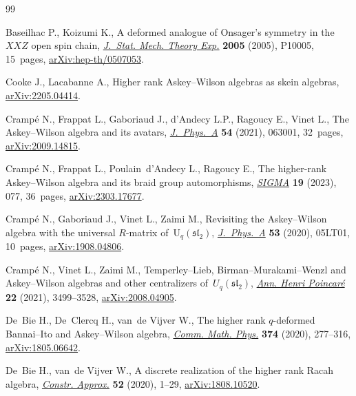 \documentclass[pdftex]{sigma}
\numberwithin{equation}{section}
\begin{document}
\begin{thebibliography}{99}
\footnotesize\itemsep=0pt

Baseilhac P., Koizumi K., A deformed analogue of {O}nsager's symmetry in
 the~{$XXZ$} open spin chain, \href{https://doi.org/10.1088/1742-5468/2005/10/p10005}{\textit{J.~Stat. Mech. Theory Exp.}}
 \textbf{2005} (2005), P10005, 15~pages, \href{https://arxiv.org/abs/hep-th/0507053}{arXiv:hep-th/0507053}.

Cooke J., Lacabanne A., Higher rank {A}skey--{W}ilson algebras as skein
 algebras, \href{https://arxiv.org/abs/2205.04414}{arXiv:2205.04414}.

Cramp\'e N., Frappat L., Gaboriaud J., d'Andecy L.P., Ragoucy E., Vinet L., The
 {A}skey--{W}ilson algebra and its avatars, \href{https://doi.org/10.1088/1751-8121/abd783}{\textit{J.~Phys.~A}} \textbf{54}
 (2021), 063001, 32~pages, \href{https://arxiv.org/abs/2009.14815}{arXiv:2009.14815}.

Cramp\'e N., Frappat L., Poulain~d'Andecy L., Ragoucy E., The higher-rank
 {A}skey--{W}ilson algebra and its braid group automorphisms, \href{https://doi.org/10.3842/SIGMA.2023.077}{\textit{SIGMA}}
 \textbf{19} (2023), 077, 36~pages, \href{https://arxiv.org/abs/2303.17677}{arXiv:2303.17677}.

Cramp\'e N., Gaboriaud J., Vinet L., Zaimi M., Revisiting the {A}skey--{W}ilson
 algebra with the universal {$R$}-matrix of~{$\mathrm{U}_q(\mathfrak{sl}_2)$},
 \href{https://doi.org/10.1088/1751-8121/ab604e}{\textit{J.~Phys.~A}} \textbf{53} (2020), 05LT01, 10~pages,
 \href{https://arxiv.org/abs/1908.04806}{arXiv:1908.04806}.

Cramp\'e N., Vinet L., Zaimi M., Temperley--{L}ieb,
 {B}irman--{M}urakami--{W}enzl and {A}skey--{W}ilson algebras and other
 centralizers of~{$U_q(\mathfrak{sl}_2)$}, \href{https://doi.org/10.1007/s00023-021-01064-x}{\textit{Ann. Henri Poincar\'e}}
 \textbf{22} (2021), 3499--3528, \href{https://arxiv.org/abs/2008.04905}{arXiv:2008.04905}.

De~Bie H., De~Clercq H., van~de Vijver W., The higher rank {$q$}-deformed
 {B}annai--{I}to and {A}skey--{W}ilson algebra, \href{https://doi.org/10.1007/s00220-019-03562-w}{\textit{Comm. Math. Phys.}}
 \textbf{374} (2020), 277--316, \href{https://arxiv.org/abs/1805.06642}{arXiv:1805.06642}.

De~Bie H., van~de Vijver W., A discrete realization of the higher rank {R}acah
 algebra, \href{https://doi.org/10.1007/s00365-019-09475-0}{\textit{Constr. Approx.}} \textbf{52} (2020), 1--29,
 \href{https://arxiv.org/abs/1808.10520}{arXiv:1808.10520}.


\end{thebibliography}
\end{document}
